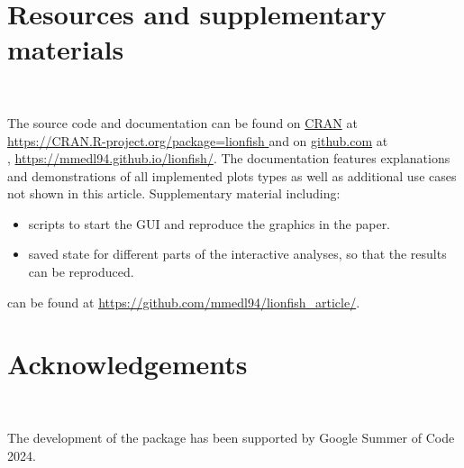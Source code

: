 \documentclass[article]{ajs}
\begin{document}
\section*{Resources and supplementary materials}~\label{resources}

The source code and documentation can be found on \href{https://CRAN.R-project.org/package=lionfish}{CRAN} at \\ \href{https://CRAN.R-project.org/package=lionfish }{https://CRAN.R-project.org/package=lionfish } and on \href{https://mmedl94.github.io/lionfish/}{github.com} at \\, \href{https://mmedl94.github.io/lionfish/}{https://mmedl94.github.io/lionfish/}. The documentation features explanations and demonstrations of all implemented plots types as well as additional use cases not shown in this article. Supplementary material including:

\begin{itemize} \itemsep 0in
\item scripts to start the GUI and reproduce the graphics in the paper.
\item saved state for different parts of the interactive analyses, so that the results can be reproduced.
\end{itemize}

can be found at \href{https://github.com/mmedl94/lionfish_article/}{https://github.com/mmedl94/lionfish\_article/}.

\section*{Acknowledgements}~\label{acknowledgements}

The development of the  package has been supported by Google Summer of Code 2024.

%

\end{document}
